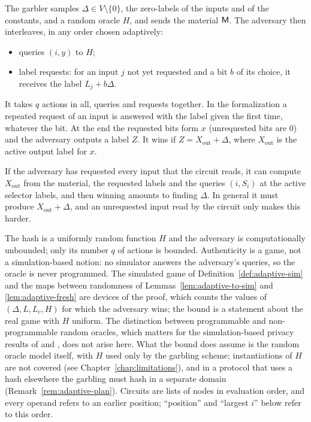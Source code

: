 \begin{definition}
  \label{def:adaptive-game}
  \leanok
  The garbler samples $\Delta \in V \setminus \{0\}$, the zero-labels of the inputs and of the
  constants, and a random oracle $H$, and sends the material $\mathsf{M}$. The adversary then interleaves,
  in any order chosen adaptively:
  \begin{itemize}
    \item queries $(i, y)$ to $H$;
    \item label requests: for an input $j$ not yet requested and a bit $b$ of its choice, it
    receives the label $L_j + b\Delta$.
  \end{itemize}
  It takes $q$ actions in all, queries and requests together. In the formalization a repeated
  request of an input is answered with the label given the first time, whatever the bit. At the
  end the requested bits form $x$ (unrequested bits are $0$) and the adversary outputs a
  label $Z$. It wins if $Z = X_{\mathrm{out}} + \Delta$, where $X_{\mathrm{out}}$ is the active
  output label for $x$.
\end{definition}

If the adversary has requested every input that the circuit reads, it can compute
$X_{\mathrm{out}}$ from the material, the requested labels and the queries $(i, S_i)$ at the active
selector labels, and then winning amounts to finding $\Delta$. In general it must produce
$X_{\mathrm{out}} + \Delta$, and an unrequested input read by the circuit only makes this harder.

\begin{remark}
  \label{rem:adaptive-model}
  The hash is a uniformly random function $H$ and the adversary is computationally unbounded; only
  its number $q$ of actions is bounded. Authenticity is a game, not a simulation-based notion: no
  simulator answers the adversary's queries, so the oracle is never programmed. The simulated game
  of Definition~\ref{def:adaptive-sim} and the maps between randomness of
  Lemmas~\ref{lem:adaptive-to-sim} and \ref{lem:adaptive-fresh} are devices of the proof, which
  counts the values of $(\Delta, L, L_c, H)$ for which the adversary wins; the bound is a statement
  about the real game with $H$ uniform. The distinction between programmable and non-programmable
  random oracles, which matters for the simulation-based privacy results of \cite{BHKO26} and
  \cite{GYWYL}, does not arise here. What the bound does assume is the random oracle model itself,
  with $H$ used only by the garbling scheme; instantiations of $H$ are not covered (see
  Chapter~\ref{chap:limitations}), and in a protocol that uses a hash elsewhere the garbling must
  hash in a separate domain (Remark~\ref{rem:adaptive-plan}). Circuits are lists of nodes in evaluation order, and every
  operand refers to an earlier position; ``position'' and ``largest $i$'' below refer to this order.
\end{remark}

